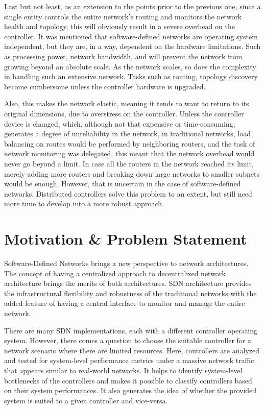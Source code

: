     Last but not least, as an extension to the points prior to the previous one, since a single entity controls the entire network's routing and monitors the network health and topology, this will obviously result in a severe overhead on the controller. It was mentioned that software-defined networks are operating system independent, but they are, in a way, dependent on the hardware limitations. Such as processing power, network bandwidth, and will prevent the network from growing beyond an absolute scale. As the network scales, so does the complexity in handling such an extensive network. Tasks such as routing, topology discovery \cite{netflow2004} become cumbersome unless the controller hardware is upgraded.
    
    Also, this makes the network elastic, meaning it tends to want to return to its original dimensions, due to overstress on the controller. Unless the controller device is changed, which, although not that expensive or time-consuming, generates a degree of unreliability in the network, in traditional networks, load balancing on routes would be performed by neighboring routers, and the task of network monitoring was delegated, this meant that the network overhead would never go beyond a limit. In case all the routers in the network reached its limit, merely adding more routers and breaking down large networks to smaller subnets would be enough. However, that is uncertain in the case of software-defined networks. Distributed controllers solve this problem to an extent, but still need more time to develop into a more robust approach.
    
    \section{Motivation \& Problem Statement}
    
    Software-Defined Networks brings a new perspective to network architectures. The concept of having a centralized approach to decentralized network architecture brings the merits of both architectures.  SDN architecture provides the infrastructural flexibility and robustness of the traditional networks with the added feature of having a central interface to monitor and manage the entire network.
    
    There are many SDN implementations, each with a different controller operating system. However, there comes a question to choose the suitable controller for a network scenario where there are limited resources. Here, controllers are analyzed and tested for system-level performance metrics under a massive network traffic that appears similar to real-world networks. It helps to identify system-level bottlenecks of the controllers and makes it possible to classify controllers based on their system performances. It also generates the idea of whether the provided system is suited to a given controller and vice-versa.